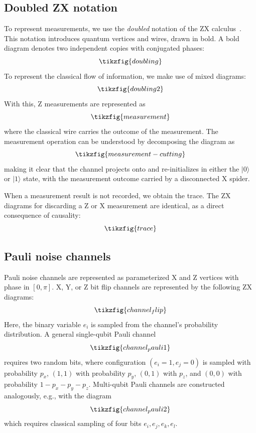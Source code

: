 \documentclass[
  a4paper,
  onecolumn,
  11pt,
  allowtoday
]{quantumarticle}
\begin{document}
\subsection{Doubled ZX notation}
\label{sec:doubling}
To represent measurements, we use the \emph{doubled} notation of the ZX calculus~\cite{van2020zx}. This notation introduces quantum vertices and wires, drawn in bold. A bold diagram denotes two independent copies with conjugated phases:
\begin{equation}
  \tikzfig{doubling}
  \label{eqn:doubling}
\end{equation}
To represent the classical flow of information, we make use of mixed diagrams:
\begin{equation}
  \tikzfig{doubling2}
  \label{eqn:doubling2}
\end{equation}
With this, Z measurements are represented as
\begin{equation}
  \tikzfig{measurement}
  \label{eqn:measurement}
\end{equation}
where the classical wire carries the outcome of the measurement.
The measurement operation can be understood by decomposing the diagram as
\begin{equation}
  \tikzfig{measurement-cutting}
  \label{eqn:measurement_cutting}
\end{equation}
making it clear that the channel projects onto and re-initializes in either the $|0\rangle$ or $|1\rangle$ state, with the measurement outcome carried by a disconnected X spider.

When a measurement result is not recorded, we obtain the trace. The ZX diagrams for discarding a Z or X measurement are identical, as a direct consequence of causality:
\begin{equation}
  \tikzfig{trace}
  \label{eqn:trace}
\end{equation}

\subsection{Pauli noise channels}
\label{sec:pauli_channels}
Pauli noise channels are represented as parameterized X and Z vertices with phase in $[0,\pi]$.
X, Y, or Z bit flip channels are represented by the following ZX diagrams:
\begin{equation}
  \tikzfig{channel_flip}
  \label{eqn:channel_flip}
\end{equation}
Here, the binary variable $e_i$ is sampled from the channel's probability distribution.
A general single-qubit Pauli channel
\begin{equation}
  \tikzfig{channel_pauli1}
  \label{eqn:channel_pauli1}
\end{equation}
requires two random bits, where configuration $(e_i=1,e_j=0)$ is sampled with probability $p_x$, $(1,1)$ with probability $p_y$, $(0,1)$ with $p_z$, and $(0,0)$ with probability $1-p_x-p_y-p_z$.
Multi-qubit Pauli channels are constructed analogously, e.g., with the diagram
\begin{equation}
  \tikzfig{channel_pauli2}
  \label{eqn:channel_pauli2}
\end{equation}
which requires classical sampling of four bits $e_i,e_j,e_k,e_l$.
\end{document}
